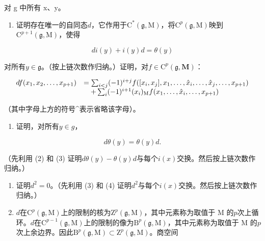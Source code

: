 对 g 中所有 x、y。

\begin{enumerate}
\def\labelenumi{(\alph{enumi})}
\setcounter{enumi}{1}
\tightlist
\item
  证明存在唯一的自同态\(d\)，它作用于\(\mathrm{C}^*(\mathfrak{g},\mathrm{M})\)，将\(\mathrm{C}^p (\mathfrak{g},\mathrm{M})\)映到\(\mathrm{C}^{p + 1}(\mathfrak{g},\mathrm{M})\)，使得
\end{enumerate}

\[
d i (y) + i (y) d = \theta (y)\tag{3}
\]

对所有\(y \in \mathfrak{g}\)。（按上链次数作归纳。）证明，对\(f \in \mathrm{C}^p(\mathfrak{g}, \mathbf{M})\)：

\[
\begin{array}{r l} d f (x _ {1}, x _ {2}, \dots , x _ {p + 1}) & = \sum_ {i <   j} (- 1) ^ {i + j} f ([ x _ {i}, x _ {j} ], x _ {1}, \dots , \hat {x} _ {i}, \dots , \hat {x} _ {j}, \dots , x _ {p + 1}) \\ & \quad + \sum_ {i} (- 1) ^ {i + 1} (x _ {i}) _ {\mathrm{M}} f (x _ {1}, \dots , \hat {x} _ {i}, \dots , x _ {p + 1}) \end{array}
\]

（其中字母上方的符号\^{}表示省略该字母）。

\begin{enumerate}
\def\labelenumi{(\alph{enumi})}
\setcounter{enumi}{2}
\tightlist
\item
  证明，对所有\(y \in g\)，
\end{enumerate}

\[
d \theta (y) = \theta (y) d.\tag{4}
\]

（先利用 (2) 和 (3) 证明\(d\theta(y) - \theta(y)d\)与每个\(i(x)\)交换。然后按上链次数作归纳。）

\begin{enumerate}
\def\labelenumi{(\alph{enumi})}
\setcounter{enumi}{3}
\item
  证明\(d^2 = 0\)。（先利用 (3) 和 (4) 证明\(d^2\)与每个\(i(x)\)交换。然后按上链次数作归纳。）
\item
  \(d\)在\(\mathrm{C}^p (\mathfrak{g},\mathrm{M})\)上的限制的核为\(\mathrm{Z}^p (\mathfrak{g},\mathrm{M})\)，其中元素称为取值于 M 的\(p\)次上循环。\(d\)在\(\mathrm{C}^{p - 1}(\mathfrak{g},\mathrm{M})\)上的限制的像为\(\mathrm{B}^p (\mathfrak{g},\mathrm{M})\)，其中元素称为取值于 M 的\(p\)次上余边界。因此\(\mathrm{B}^p (\mathfrak{g},\mathrm{M})\subset \mathrm{Z}^p (\mathfrak{g},\mathrm{M})\)。商空间
\end{enumerate}


